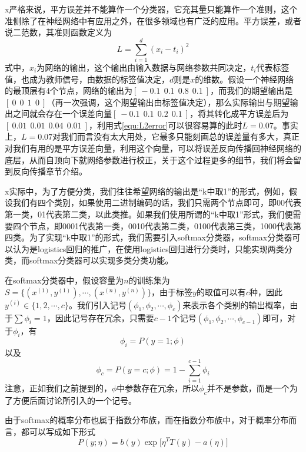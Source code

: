 x严格来说，平方误差并不能算作一个分类器，它充其量只能算作一个准则，这个准侧除了在神经网络中有应用之外，在很多领域也有广泛的应用。平方误差，或者说二范数，其准则函数定义为
\begin{equation}
L = \sum\limits_{i=1}^d (x_i -t_i)^2
\label{equ:L2error}
\end{equation}
式中，$x_i$为网络的输出，这个输出由输入数据与网络参数共同决定，$t_i$代表标签值，也成为教师信号，由数据的标签值决定，$d$则是$x$的维数。假设一个神经网络的最顶层有4个节点，网络的输出为$[~-0.1~~0.1~~0.8~~0.1~]$，而我们的期望输出是$[~0~~0~~1~~0~]$（再一次强调，这个期望输出由标签值决定），那么实际输出与期望输出之间就会存在一个误差向量$[~-0.1~~0.1~~0.2~~0.1~]$，将其转化成平方误差后为$[~0.01~~0.01~~0.04~~0.01~]$，利用式\eqref{equ:L2error}可以很容易算的此时$L=0.07$。事实上，$L=0.07$对我们而言没有太大用处，它最多只能刻画总的误差量有多大，真正对我们有用的是平方误差向量，利用这个向量，可以将误差反向传播回神经网络的底层，从而自顶向下就网络参数进行校正，关于这个过程更多的细节，我们将会留到反向传播章节介绍。

x实际中，为了方便分类，我们往往希望网络的输出是“k中取1”的形式，例如，假设我们有四个类别，如果使用二进制编码的话，我们只需两个节点即可，即00代表第一类，01代表第二类，以此类推。如果我们使用所谓的“k中取1”形式，我们便需要四个节点，即0001代表第一类，0010代表第二类，0100代表第三类，1000代表第四类。为了实现“k中取1”的形式，我们需要引入softmax分类器，softmax分类器可以认为是logistics回归的推广，在使用logistics回归进行分类时，只能实现两类分类，而softmax分类器可以实现多类分类功能。

在softmax分类器中，假设容量为$n$的训练集为$S = \big\{(x^{(1)}, y^{(1)}), \cdots, (x^{(n)}, y^{(n)})\big\}$，由于标签$y$的取值可以有$c$种，因此$y^{(i)} \in \{1, 2,  \cdots, c\}$。我们引入记号$(\phi_1, \phi_2, \cdots, \phi_c)$来表示各个类别的输出概率，由于$\sum\phi_i = 1$，因此记号存在冗余，只需要$c - 1$个记号$(\phi_1, \phi_2, \cdots, \phi_{c-1})$即可，对于$\phi_i$，有
\begin{equation}
\phi_i = P(y = 1; \phi)
\end{equation}
以及
\begin{equation}
\phi_c = P(y = c; \phi) = 1 - \sum\limits_{i=1}^{c-1}\phi_i
\end{equation}
注意，正如我们之前提到的，$\phi$中参数存在冗余，所以$\phi_c$并不是参数，而是一个为了方便后面讨论所引入的一个记号。

由于softmax的概率分布也属于指数分布族，而在指数分布族中，对于概率分布而言，都可以写成如下形式
\begin{equation}\label{equ:expFamily}
P(y; \eta) = b(y) \exp \bigg[\eta^T T(y) - a(\eta)\bigg]
\end{equation}

